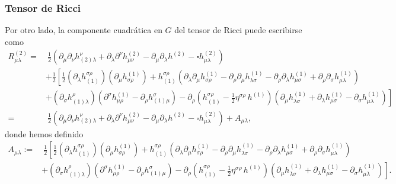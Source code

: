 \subsubsection{Tensor de Ricci}
Por otro lado, la componente cuadrática en $G$ del tensor de Ricci puede escribirse como
\begin{align}
R^{(2)}_{\mu\lambda} = &\ \frac{1}{2}\left(\partial_\mu\partial_\nu h^\nu_{(2)\lambda}+ \partial_\lambda \partial^\nu h^{(2)}_{\mu\nu} - \partial_\mu\partial_\lambda h^{(2)} -\square h^{(2)}_{\mu\lambda}\right) \\
& +\frac{1}{2}\left[\frac{1}{2}(\partial_\lambda h^{\sigma\rho}_{(1)})(\partial_\mu h_{\sigma\rho}^{(1)})+h^{\sigma\rho}_{(1)}\left(\partial_\lambda\partial_\mu h^{(1)}_{\sigma\rho}-\partial_\rho\partial_\mu h^{(1)}_{\lambda\sigma}-\partial_\rho\partial_\lambda h^{(1)}_{\mu\sigma}+ \partial_\rho\partial_\sigma h^{(1)}_{\mu\lambda}\right) \right.\\
& \left.+ (\partial_\sigma h^\rho_{(1)\lambda})\left(\partial^\sigma h^{(1)}_{\mu\rho}-\partial_\rho h^\sigma_{(1)\mu}\right) -\partial_\rho\left(h^{\sigma\rho}_{(1)}-\frac{1}{2}\eta^{\sigma\rho}\,h^{(1)}\right)\left(\partial_\mu h^{(1)}_{\lambda\sigma}+\partial_\lambda h^{(1)}_{\mu\sigma}-\partial_\sigma h^{(1)}_{\mu\lambda}\right) \right]\\
=&\ \frac{1}{2}\left(\partial_\mu\partial_\nu h^\nu_{(2)\lambda}+ \partial_\lambda \partial^\nu h^{(2)}_{\mu\nu} - \partial_\mu\partial_\lambda h^{(2)} -\square h^{(2)}_{\mu\lambda}\right) +A_{\mu\lambda},
\end{align}
donde hemos definido
\begin{align}
A_{\mu\lambda} := & \ \frac{1}{2}\left[\frac{1}{2}(\partial_\lambda h^{\sigma\rho}_{(1)})
(\partial_\mu h_{\sigma\rho}^{(1)})+h^{\sigma\rho}_{(1)}
\left(\partial_\lambda\partial_\mu h^{(1)}_{\sigma\rho}-\partial_\rho\partial_\mu
h^{(1)}_{\lambda\sigma}-\partial_\rho\partial_\lambda h^{(1)}_{\mu\sigma}
+ \partial_\rho\partial_\sigma h^{(1)}_{\mu\lambda}\right) \right. \nonumber\\
& + \left.  (\partial_\sigma h^\rho_{(1)\lambda})\left(\partial^\sigma h^{(1)}_{\mu\rho}-\partial_\rho h^\sigma_{(1)\mu}\right) -\partial_\rho\left(h^{\sigma\rho}_{(1)}-\frac{1}{2}\eta^{\sigma\rho}\,h^{(1)}\right)\left(\partial_\mu h^{(1)}_{\lambda\sigma}+\partial_\lambda h^{(1)}_{\mu\sigma}-\partial_\sigma h^{(1)}_{\mu\lambda}\right) \right]. \label{defAmn}
\end{align}

